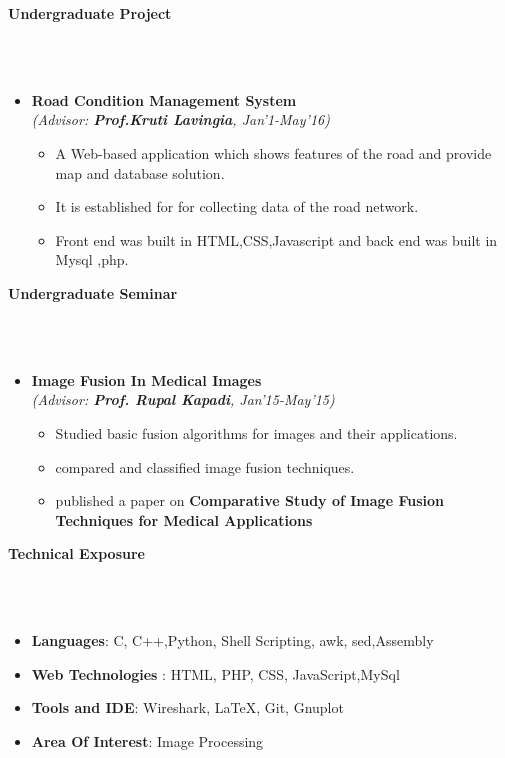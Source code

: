 \documentclass[a4paper,10pt]{article}
\newcommand{\isep}{-2 pt}
\newcommand{\lsep}{-0.5cm}
\newcommand{\resheading}[1]{{\small \colorbox{mygrey}{\begin{minipage}{0.975\textwidth}{\textbf{#1 \vphantom{p\^{E}}}}\end{minipage}}}}
\begin{document}
\resheading{\textbf{\large Undergraduate Project} }\\[\lsep]\\[-0.3cm]
\begin{itemize}
\item \textbf{Road Condition Management System}\\
 \emph{(Advisor: \textbf{Prof.Kruti Lavingia}, Jan'1-May'16)} \\[-0.6cm]
      \begin{itemize}\itemsep \isep
	    \item A Web-based application which shows features of the road and provide map and database solution.
		 \item It is established for for collecting data of the road network. 
		 \item Front end was built in HTML,CSS,Javascript  and back end was built in Mysql ,php.
\end{itemize}
\end{itemize}

\resheading{\textbf{\large Undergraduate Seminar} }\\[\lsep]\\[-0.3cm]
\begin{itemize}
\item \textbf{Image Fusion In Medical Images}\\
 \emph{(Advisor: \textbf{Prof. Rupal Kapadi}, Jan'15-May'15)} \\[-0.6cm]
      \begin{itemize}\itemsep \isep
	    \item Studied basic  fusion algorithms for images and their applications.
		 \item compared and classified image fusion techniques.
		 \item published a paper on \textbf {Comparative Study of Image Fusion Techniques for Medical Applications}
\end{itemize}
\end{itemize}

\resheading{\textbf{\large Technical Exposure}}\\[\lsep]\\[-0.3cm]
 \begin{itemize}
  \item \textbf{Languages}: C, C++,Python, Shell Scripting, awk, sed,Assembly \\[-0.55cm] 
  \item \textbf{Web Technologies }: HTML, PHP, CSS, JavaScript,MySql \\[-0.55cm] 
 \item \textbf{Tools and IDE}: Wireshark, \LaTeX, Git, Gnuplot \\[-0.6cm]
  \item \textbf{Area Of Interest}: Image Processing
  \end{itemize}
\end{document}

